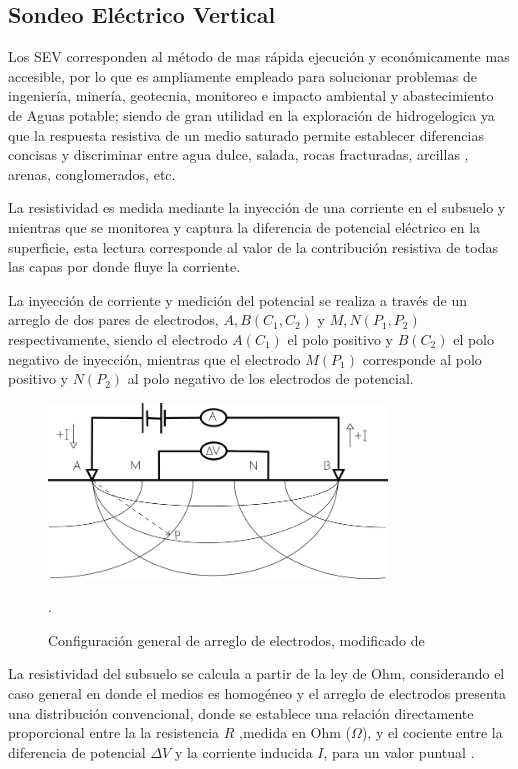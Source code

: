 		\subsection{Sondeo Eléctrico Vertical}
			
			Los SEV corresponden al método de mas rápida ejecución y económicamente mas accesible, por lo que es ampliamente empleado para solucionar problemas de ingeniería, minería, geotecnia, monitoreo e impacto ambiental y abastecimiento de Aguas potable; siendo de gran utilidad en la exploración de hidrogelogica ya que la respuesta resistiva de un medio saturado permite establecer diferencias concisas y discriminar entre agua dulce, salada, rocas fracturadas, arcillas , arenas, conglomerados, etc.
			
			La resistividad es medida mediante la inyección de una corriente en el subsuelo y mientras que se monitorea y captura la diferencia de potencial eléctrico en la superficie, esta lectura corresponde al valor de la contribución resistiva de todas las capas por donde fluye la corriente.
			
			La inyección de corriente y medición del potencial se realiza a través de un arreglo de dos pares de electrodos, $A, B (C_{1}, C_{2})$ y $M, N (P_{1}, P_{2}) $ respectivamente, siendo el electrodo $A (C_{1})$ el polo positivo y $B (C_{2})$ el polo negativo de inyección, mientras que el electrodo $M (P_{1})$ corresponde al polo positivo y $N (P_{2})$ al polo negativo de los electrodos de potencial.\\
			 
			\begin{figure}[h!]
				\centering
				\includegraphics[width=9cm]{Imagenes/ArregloElectrodos}
				\caption[Configuración general de electrodos]{Configuración general de arreglo de electrodos, modificado de \citet{reynolds2011}}.
				\label{fig:AE}
			\end{figure}
			La resistividad del subsuelo se calcula a partir de la ley de Ohm, considerando el caso general en donde el medios es homogéneo y el arreglo de electrodos presenta una distribución convencional, donde se establece una relación directamente proporcional entre la la resistencia $R$ ,medida en Ohm ($\Omega$), y el cociente entre la diferencia de potencial $\Delta V$ y la corriente inducida $I$, para un valor puntual \citep{igboama2023}.
			
